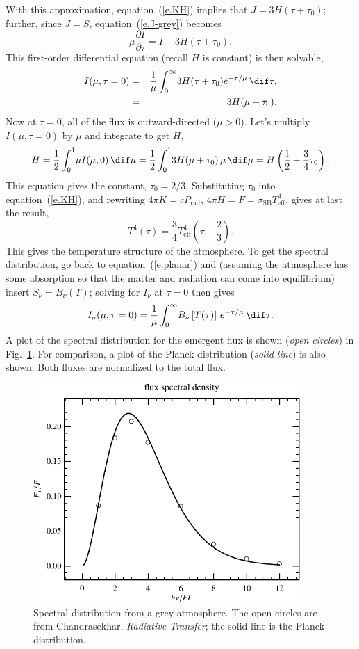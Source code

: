 With this approximation, equation~(\ref{e.KH}) implies that $J = 3H(\tau + \tau_{0})$; further, since $J = S$, equation~(\ref{e.J-grey}) becomes
\begin{equation}
\mu\frac{\partial I}{\partial\tau} = I - 3H(\tau+\tau_{0}).
\end{equation}
This first-order differential equation (recall $H$ is constant) is then solvable,
\begin{eqnarray}
I(\mu,\tau=0) &=& \frac{1}{\mu}\int_{0}^{\infty}\!3H(\tau + \tau_{0}) e^{-\tau/\mu}\,\dif\tau,\nonumber\\
  &=& 3H(\mu + \tau_{0}).
\end{eqnarray}
Now at $\tau = 0$, all of the flux is outward-directed ($\mu >0$).  Let's multiply $I(\mu,\tau = 0)$ by $\mu$ and integrate to get $H$,
\begin{equation}
H = \frac{1}{2}\int_{0}^{1}\!\mu I(\mu,0)\,\dif\mu = \frac{1}{2}\int_{0}^{1}\!3H(\mu + \tau_{0})\,\mu\,\dif\mu = H\left(\frac{1}{2} + \frac{3}{4}\tau_{0}\right).
\end{equation}
This equation gives the constant, $\tau_{0} = 2/3$. Substituting $\tau_{0}$ into equation~(\ref{e.KH}), and rewriting $4\pi K = cP_{\mathrm{rad}}$, $4\pi H =  F = \sigma_{\mathrm{SB}}T_{\mathrm{eff}}^{4}$, gives at last the result,
\begin{equation}\label{e.Eddington}
T^{4}(\tau) = \frac{3}{4}T_{\mathrm{eff}}^{4}\left(\tau + \frac{2}{3}\right).
\end{equation}
This gives the temperature structure of the atmosphere.  To get the spectral distribution, go back to equation~(\ref{e.planar}) and (assuming the atmosphere has some absorption so that the matter and radiation can come into equilibrium) insert $S_{\nu} = B_{\nu}(T)$; solving for $I_{\nu}$ at $\tau = 0$ then gives
\begin{equation}\label{e.spectral}
I_{\nu}(\mu,\tau=0) = \frac{1}{\mu}\int_{0}^{\infty}\!B_{\nu}\left[T(\tau)\right] \, e^{-\tau/\mu}\,\dif\tau.
\end{equation}
A plot of the spectral distribution for the emergent flux is shown (\emph{open circles}) in Fig.~\ref{f.spectral}. For comparison, a plot of the Planck distribution (\emph{solid line}) is also shown. Both fluxes are normalized to the total flux.

\begin{figure}[htbp]
\includegraphics[width=4in]{plots_out/spectral_distribution}
\caption{\label{f.spectral} Spectral distribution from a grey atmosphere. The open circles are from Chandrasekhar, \emph{Radiative Transfer}; the solid line is the Planck distribution.}
\end{figure}
